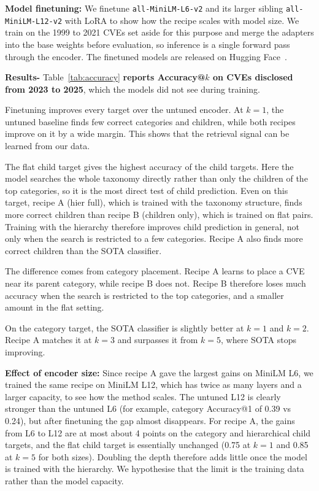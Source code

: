 \documentclass[conference,compsoc]{IEEEtran}
\begin{document}
\textbf{Model finetuning:} We finetune \texttt{all-MiniLM-L6-v2} and its larger sibling \texttt{all-MiniLM-L12-v2} with LoRA to show how the recipe scales with model size. We train on the 1999 to 2021 CVEs set aside for this purpose and merge the adapters into the base weights before evaluation, so inference is a single forward pass through the encoder. The finetuned models are released on Hugging Face~\cite{hicwe2026models}.

\textbf{Results-} Table~\ref{tab:accuracy} \textbf{reports Accuracy@$k$ on CVEs disclosed from 2023 to 2025}, which the models did not see during training. 


Finetuning improves every target over the untuned encoder. At $k=1$, the untuned baseline finds few correct categories and children, while both recipes improve on it by a wide margin. This shows that the retrieval signal can be learned from our data.

The flat child target gives the highest accuracy of the child targets. Here the model searches the whole taxonomy directly rather than only the children of the top categories, so it is the most direct test of child prediction. Even on this target, recipe A (hier full), which is trained with the taxonomy structure, finds more correct children than recipe B (children only), which is trained on flat pairs. Training with the hierarchy therefore improves child prediction in general, not only when the search is restricted to a few categories. Recipe A also finds more correct children than the SOTA classifier.

The difference comes from category placement. Recipe A learns to place a CVE near its parent category, while recipe B does not. Recipe B therefore loses much accuracy when the search is restricted to the top categories, and a smaller amount in the flat setting.

On the category target, the SOTA classifier is slightly better at $k=1$ and $k=2$. Recipe A matches it at $k=3$ and surpasses it from $k=5$, where SOTA stops improving.

\textbf{Effect of encoder size: }
Since recipe A gave the largest gains on MiniLM L6, we trained the same recipe on MiniLM L12, which has twice as many layers and a larger capacity, to see how the method scales. The untuned L12 is clearly stronger than the untuned L6 (for example, category Accuracy@1 of 0.39 vs 0.24), but after finetuning the gap almost disappears. For recipe A, the gains from L6 to L12 are at most about 4 points on the category and hierarchical child targets, and the flat child target is essentially unchanged (0.75 at $k=1$ and 0.85 at $k=5$ for both sizes). Doubling the depth therefore adds little once the model is trained with the hierarchy. We hypothesise that the limit is the training data rather than the model capacity.
\end{document}
